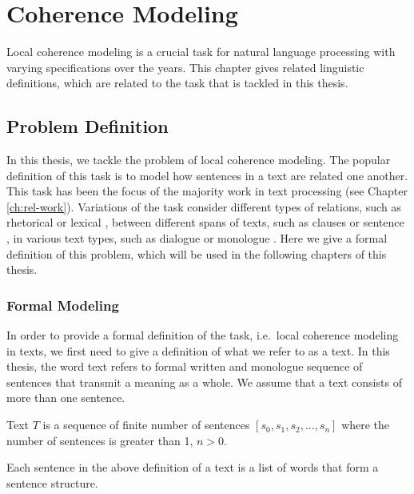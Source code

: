 
\chapter{Coherence Modeling}
\label{ch:coherence}

Local coherence modeling is a crucial task for natural language processing with varying specifications over the years. 
This chapter gives related linguistic definitions, which are related to the task that is tackled in this thesis. 


\section{Problem Definition}
\label{sec:coh-def}

In this thesis, we tackle the problem of local coherence modeling. 
The popular definition of this task is to model how sentences in a text are related one another. 
This task has been the focus of the majority work in text processing (see Chapter \ref{ch:rel-work}). 
Variations of the task consider different types of relations, such as rhetorical \cite{hovyeduard89} or lexical \cite{morris91}, between different spans of texts, such as clauses \cite{strube.col98} or sentence \cite{halliday76}, in various text types, such as dialogue \cite{wangxinhao13} or monologue \cite{barzilay08}. 
Here we give a formal definition of this problem, which will be used in the following chapters of this thesis. 

\subsection{Formal Modeling}

In order to provide a formal definition of the task, i.e.\ local coherence modeling in texts, we first need to give a definition of what we refer to as a text. 
In this thesis, the word text refers to formal written and monologue sequence of sentences that transmit a meaning as a whole.  
We assume that a text consists of more than one sentence. 

\begin{definition}
Text $T$ is a sequence of finite number of sentences $[s_0, s_1, s_2, ..., s_n]$ where the number of sentences is greater than 1, $n>0$.   
\end{definition}

Each sentence in the above definition of a text is a list of words that form a sentence structure. 

